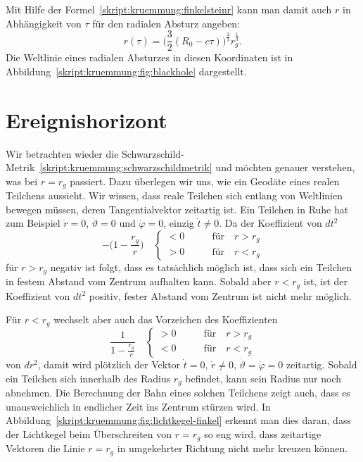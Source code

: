 Mit Hilfe der Formel~\eqref{skript:kruemmung:finkelsteinr}
kann man damit auch $r$ in Abhängigkeit von $\tau$ für den radialen Absturz
angeben:
\[
r(\tau)=\biggl(\frac32(R_0-c\tau)\biggr)^{\frac23}r_g^{\frac13}.
\]
Die Weltlinie eines radialen Absturzes in diesen Koordinaten ist in
Abbildung~\ref{skript:kruemmung:fig:blackhole} dargestellt.

\section{Ereignishorizont%
\label{skript:section:ereignishorizont}}
Wir betrachten wieder die
Schwarzschild-Metrik~\eqref{skript:kruemmung:schwarzschildmetrik}
und möchten genauer verstehen, was bei $r=r_g$ passiert.
Dazu überlegen wir uns, wie ein Geodäte eines realen Teilchens 
aussieht.
Wir wissen, dass reale Teilchen sich entlang von Weltlinien bewegen müssen,
deren Tangentialvektor zeitartig ist.
Ein Teilchen in Ruhe hat zum Beispiel $\dot r=0$, $\dot \vartheta=0$ und
$\dot\varphi=0$, einzig $\dot t\ne 0$.
Da der Koeffizient von $dt^2$
\[
-\biggl(1-\frac{r_g}{r}\biggr)
\quad
\begin{cases}
<0&\qquad\text{für}\quad r > r_g
\\
>0&\qquad\text{für}\quad r < r_g
\end{cases}
\]
für $r>r_g$
negativ ist folgt, dass es tatsächlich möglich ist, dass sich ein Teilchen
in festem Abstand vom Zentrum aufhalten kann.
Sobald aber $r<r_g$ ist, ist der Koeffizient von $dt^2$ positiv,
fester Abstand vom Zentrum ist nicht mehr möglich.

Für $r<r_g$ wechselt aber auch das Vorzeichen des Koeffizienten
\[
\frac1{\displaystyle1-\frac{r_g}{r}}
\quad
\begin{cases}
>0&\qquad \text{für}\quad r>r_g
\\
<0&\qquad \text{für}\quad r<r_g
\end{cases}
\]
von $dr^2$, damit wird plötzlich der Vektor $\dot t=0$, $\dot r\ne 0$,
$\dot\vartheta=\dot\varphi=0$ zeitartig.
Sobald ein Teilchen sich innerhalb des Radius $r_g$ befindet, kann
sein Radius nur noch abnehmen.
Die Berechnung der Bahn eines solchen Teilchens zeigt auch, dass
es unausweichlich in endlicher Zeit ins Zentrum stürzen wird.
In Abbildung~\ref{skript:kruemmung:fig:lichtkegel-finkel} erkennt 
man dies daran, dass der Lichtkegel beim Überschreiten von $r=r_g$
so eng wird, dass zeitartige Vektoren die Linie $r=r_g$ in umgekehrter
Richtung nicht mehr kreuzen können.

